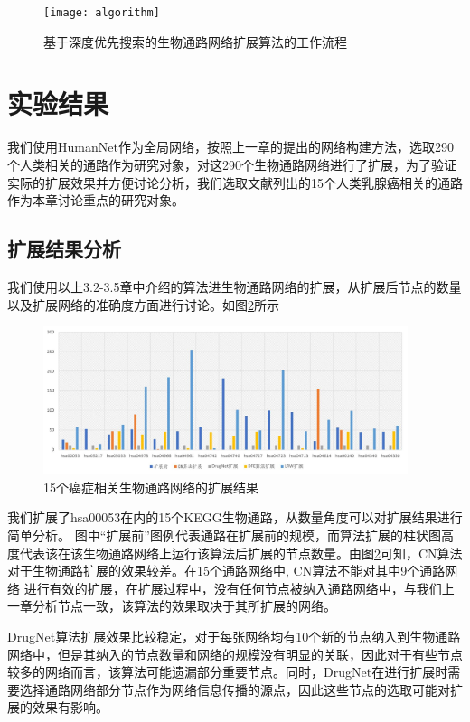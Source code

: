 \begin{figure}[h]
\centering
\texttt{[image: algorithm]}
\caption[algorithm]{基于深度优先搜索的生物通路网络扩展算法的工作流程}
\label{algorithm}
\end{figure}


 \section{实验结果}
 我们使用HumanNet作为全局网络，按照上一章的提出的网络构建方法，选取290个人类相关的通路作为研究对象，对这290个生物通路网络进行了扩展，为了验证实际的扩展效果并方便讨论分析，我们选取文献\cite{zhang2016network}列出的15个人类乳腺癌相关的通路作为本章讨论重点的研究对象。
 \subsection{扩展结果分析}
 我们使用以上3.2-3.5章中介绍的算法进生物通路网络的扩展，从扩展后节点的数量以及扩展网络的准确度方面进行讨论。如图\ref{allexpansion}所示
 \begin{figure}[h]
\centering
\includegraphics[width = 0.95\textwidth]{allexpansion}
\caption[allexpansion]{15个癌症相关生物通路网络的扩展结果}
\label{allexpansion}
\end{figure}

我们扩展了hsa00053在内的15个KEGG\cite{kanehisa2008kegg}生物通路，从数量角度可以对扩展结果进行简单分析。
图中“扩展前”图例代表通路在扩展前的规模，而算法扩展的柱状图高度代表该在该生物通路网络上运行该算法后扩展的节点数量。由图\ref{allexpansion}可知，CN算法对于生物通路扩展的效果较差。在15个通路网络中, CN算法不能对其中9个通路网络
进行有效的扩展，在扩展过程中，没有任何节点被纳入通路网络中，与我们上一章分析节点一致，该算法的效果取决于其所扩展的网络。

DrugNet算法扩展效果比较稳定，对于每张网络均有10个新的节点纳入到生物通路网络中，但是其纳入的节点数量和网络的规模没有明显的关联，因此对于有些节点较多的网络而言，该算法可能遗漏部分重要节点。同时，DrugNet在进行扩展时需要选择通路网络部分节点作为网络信息传播的源点，因此这些节点的选取可能对扩展的效果有影响。


